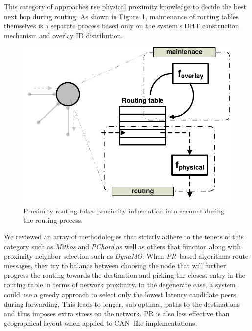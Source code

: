 This category of approaches use physical proximity knowledge to decide the best
next hop during routing. As shown in Figure~\ref{figure:proximity-routing},
maintenance of routing tables themselves is a separate process based only on the
system's DHT construction mechanism and overlay ID distribution.

\begin{figure}[ht]
\centering
  \includegraphics[scale=0.48]{img/pdf/proximity-routing.pdf}
\caption{Proximity routing takes proximity information into account during the
routing process.}
\label{figure:proximity-routing}
\end{figure}
We reviewed an array of methodologies that strictly adhere to 
the tenets of this category such as \emph{Mithos} and
\emph{PChord} as well as others that function along with 
proximity neighbor selection such as \emph{DynaMO}.
When \emph{PR}--based algorithms route messages, they try to balance between
choosing the node that will further progress the routing towards the
destination and picking the closest entry in the routing table
in terms of network proximity. 
In the degenerate case, a system could use a greedy approach to select
only the lowest latency candidate peers during forwarding. This leads to
longer, sub-optimal, paths to the destinations and thus imposes
extra stress on the network. PR is also less
effective than geographical layout when applied to CAN--like implementations.


